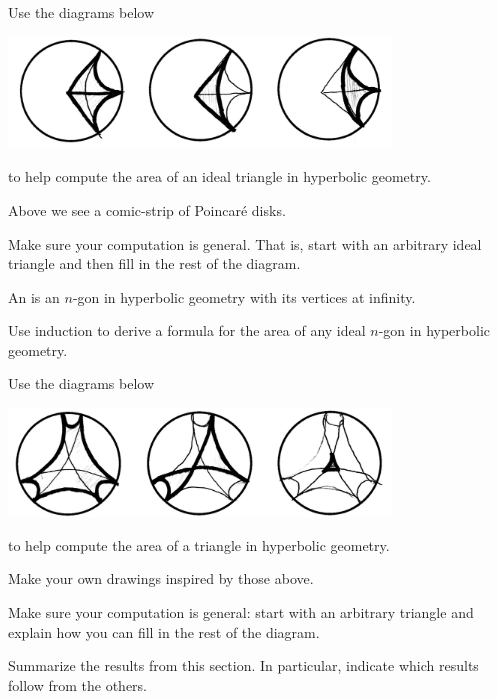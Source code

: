 \documentclass[newpage,hints,handout]{ximera}
\begin{document}
\begin{problem}
  Use the diagrams below
  \begin{image}
  \includegraphics[width=4in]{diagramOfIdealTri.png}
  \end{image}
  to help compute the area of an ideal triangle in hyperbolic geometry.
  \begin{hint}
    Above we see a comic-strip of Poincar\'e disks.
  \end{hint}
  \begin{hint}
    Make sure your computation is general.  That is, start with an arbitrary
    ideal triangle and then fill in the rest of the diagram.
  \end{hint}
\end{problem}


\begin{definition}
  An  is an $n$-gon in hyperbolic
  geometry with its vertices at infinity.
\end{definition}

\begin{problem}
Use induction to derive a formula for the area of any ideal $n$-gon in
hyperbolic geometry.
\end{problem}

\begin{problem}
  Use the diagrams below
  \begin{image}
  \includegraphics[width=4in]{diagramHex.png}
  \end{image}
  to help compute the area of a triangle in hyperbolic geometry.
  \begin{hint}
    Make your own drawings inspired by those above.
  \end{hint}
  \begin{hint}
    Make sure your computation is general: start with an arbitrary triangle and
    explain how you can fill in the rest of the diagram.
  \end{hint}
\end{problem}


\begin{problem}
Summarize the results from this section. In particular, indicate which
results follow from the others.
\begin{freeResponse}
\end{freeResponse}
\end{problem}
\end{document}
